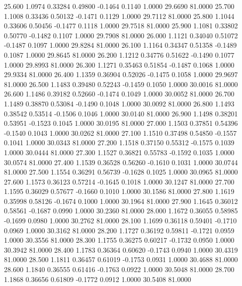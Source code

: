   25.600   1.0974   0.33284   0.49800  -0.1464   0.1140   1.0000  29.6690  81.0000
  25.700   1.1008   0.33436   0.50132  -0.1471   0.1129   1.0000  29.7112  81.0000
  25.800   1.1044   0.33606   0.50456  -0.1477   0.1118   1.0000  29.7518  81.0000
  25.900   1.1081   0.33802   0.50770  -0.1482   0.1107   1.0000  29.7908  81.0000
  26.000   1.1121   0.34040   0.51072  -0.1487   0.1097   1.0000  29.8284  81.0000
  26.100   1.1164   0.34347   0.51358  -0.1489   0.1087   1.0000  29.8645  81.0000
  26.200   1.1212   0.34776   0.51622  -0.1490   0.1077   1.0000  29.8993  81.0000
  26.300   1.1271   0.35463   0.51854  -0.1487   0.1068   1.0000  29.9334  81.0000
  26.400   1.1359   0.36904   0.52026  -0.1475   0.1058   1.0000  29.9697  81.0000
  26.500   1.1483   0.39480   0.52243  -0.1459   0.1050   1.0000  30.0016  81.0000
  26.600   1.1486   0.39182   0.52660  -0.1474   0.1049   1.0000  30.0052  81.0000
  26.700   1.1489   0.38870   0.53084  -0.1490   0.1048   1.0000  30.0092  81.0000
  26.800   1.1493   0.38542   0.53514  -0.1506   0.1046   1.0000  30.0140  81.0000
  26.900   1.1498   0.38201   0.53951  -0.1523   0.1045   1.0000  30.0195  81.0000
  27.000   1.1503   0.37851   0.54396  -0.1540   0.1043   1.0000  30.0262  81.0000
  27.100   1.1510   0.37498   0.54850  -0.1557   0.1041   1.0000  30.0343  81.0000
  27.200   1.1518   0.37150   0.55312  -0.1575   0.1039   1.0000  30.0444  81.0000
  27.300   1.1527   0.36821   0.55783  -0.1592   0.1035   1.0000  30.0574  81.0000
  27.400   1.1539   0.36528   0.56260  -0.1610   0.1031   1.0000  30.0744  81.0000
  27.500   1.1554   0.36291   0.56739  -0.1628   0.1025   1.0000  30.0965  81.0000
  27.600   1.1573   0.36123   0.57214  -0.1645   0.1018   1.0000  30.1247  81.0000
  27.700   1.1595   0.36029   0.57677  -0.1660   0.1010   1.0000  30.1586  81.0000
  27.800   1.1619   0.35998   0.58126  -0.1674   0.1000   1.0000  30.1964  81.0000
  27.900   1.1645   0.36012   0.58561  -0.1687   0.0990   1.0000  30.2360  81.0000
  28.000   1.1672   0.36055   0.58985  -0.1699   0.0980   1.0000  30.2762  81.0000
  28.100   1.1699   0.36118   0.59401  -0.1710   0.0969   1.0000  30.3162  81.0000
  28.200   1.1727   0.36192   0.59811  -0.1721   0.0959   1.0000  30.3556  81.0000
  28.300   1.1755   0.36275   0.60217  -0.1732   0.0950   1.0000  30.3942  81.0000
  28.400   1.1783   0.36364   0.60620  -0.1743   0.0940   1.0000  30.4319  81.0000
  28.500   1.1811   0.36457   0.61019  -0.1753   0.0931   1.0000  30.4688  81.0000
  28.600   1.1840   0.36555   0.61416  -0.1763   0.0922   1.0000  30.5048  81.0000
  28.700   1.1868   0.36656   0.61809  -0.1772   0.0912   1.0000  30.5408  81.0000
